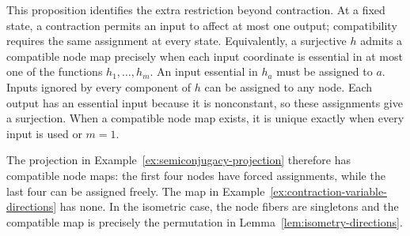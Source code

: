 This proposition identifies the extra restriction beyond contraction. At a fixed state, a contraction permits an input to affect at most one output; compatibility requires the same assignment at every state. Equivalently, a surjective $h$ admits a compatible node map precisely when each input coordinate is essential in at most one of the functions $h_1,\dots,h_m$. An input essential in $h_a$ must be assigned to $a$. Inputs ignored by every component of $h$ can be assigned to any node. Each output has an essential input because it is nonconstant, so these assignments give a surjection. When a compatible node map exists, it is unique exactly when every input is used or $m=1$.

The projection in Example~\ref{ex:semiconjugacy-projection} therefore has compatible node maps: the first four nodes have forced assignments, while the last four can be assigned freely. The map in Example~\ref{ex:contraction-variable-directions} has none. In the isometric case, the node fibers are singletons and the compatible map is precisely the permutation in Lemma~\ref{lem:isometry-directions}.

